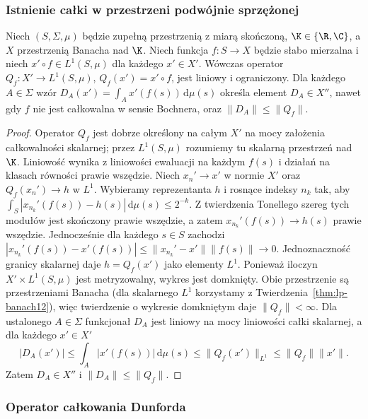 \subsubsection{Istnienie całki w przestrzeni podwójnie sprzężonej}

\begin{twierdzenie}
\label{thm:dunford-closedgraph15b}
Niech $(S,\Sigma,\mu)$ będzie zupełną przestrzenią
z miarą skończoną, $\K\in\{\R,\C\}$, a $X$ przestrzenią
Banacha nad $\K$. Niech funkcja $f:S\to X$ będzie słabo
mierzalna i niech $x'\circ f\in L^1(S,\mu)$ dla każdego
$x'\in X'$. Wówczas operator $Q_f:X'\to L^1(S,\mu)$,
$Q_f(x')=x'\circ f$, jest liniowy i ograniczony.
Dla każdego $A\in\Sigma$ wzór
$D_A(x')=\int_Ax'(f(s))\,\mathrm d\mu(s)$
określa element $D_A\in X''$, nawet gdy $f$ nie jest
całkowalna w sensie Bochnera, oraz
$\|D_A\|\le\|Q_f\|$.
\end{twierdzenie}
\begin{proof}
Operator $Q_f$ jest dobrze określony na całym $X'$ na mocy
założenia całkowalności skalarnej; przez $L^1(S,\mu)$ rozumiemy
tu skalarną przestrzeń nad $\K$. Liniowość wynika z liniowości
ewaluacji na każdym $f(s)$ i działań na klasach równości prawie
wszędzie. Niech $x_n'\to x'$ w normie $X'$ oraz
$Q_f(x_n')\to h$ w $L^1$. Wybieramy reprezentanta $h$
i rosnące indeksy $n_k$ tak, aby
$\int_S|x_{n_k}'(f(s))-h(s)|\,\mathrm d\mu(s)\le 2^{-k}$.
Z twierdzenia Tonellego szereg tych modułów jest skończony
prawie wszędzie, a zatem $x_{n_k}'(f(s))\to h(s)$ prawie
wszędzie. Jednocześnie dla każdego $s\in S$ zachodzi
$|x_{n_k}'(f(s))-x'(f(s))|\le
\|x_{n_k}'-x'\|\|f(s)\|\to0$.
Jednoznaczność granicy skalarnej daje $h=Q_f(x')$ jako
elementy $L^1$. Ponieważ iloczyn $X'\times L^1(S,\mu)$
jest metryzowalny, wykres jest domknięty. Obie przestrzenie
są przestrzeniami Banacha (dla skalarnego $L^1$ korzystamy
z Twierdzenia~\ref{thm:lp-banach12}), więc twierdzenie
o wykresie domkniętym daje $\|Q_f\|<\infty$.
Dla ustalonego $A\in\Sigma$ funkcjonał $D_A$ jest liniowy
na mocy liniowości całki skalarnej, a dla każdego $x'\in X'$
\[
 |D_A(x')|\le\int_A|x'(f(s))|\,\mathrm d\mu(s)
 \le\|Q_f(x')\|_{L^1}\le\|Q_f\|\|x'\|.
\]
Zatem $D_A\in X''$ i $\|D_A\|\le\|Q_f\|$.
\end{proof}

\subsubsection{Operator całkowania Dunforda}

